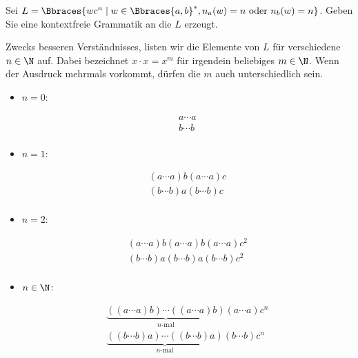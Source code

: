 
\begin{exercise}

Sei $L = \Bbraces{w c^n \mid w \in \Bbraces{a, b}^\ast, n_a(w) = n ~\text{oder}~ n_b(w) = n}$.
Geben Sie eine kontextfreie Grammatik an die $L$ erzeugt.

\end{exercise}


\begin{solution}

Zwecks besseren Verständnisses, listen wir die Elemente von $L$ für verschiedene $n \in \N$ auf.
Dabei bezeichnet $x \cdot x = x^m$ für irgendein beliebiges $m \in \N$.
Wenn der Ausdruck mehrmals vorkommt, dürfen die $m$ auch unterschiedlich sein.

\begin{itemize}

    \item $n = 0$:
    
    \begin{align*}
        a \cdots a \\
        b \cdots b \\
    \end{align*}

    \item $n = 1$:
    
    \begin{align*}
        (a \cdots a) b (a \cdots a) c \\
        (b \cdots b) a (b \cdots b) c \\
    \end{align*}

    \item $n = 2$:
    
    \begin{align*}
        (a \cdots a) b (a \cdots a) b (a \cdots a) c^2 \\
        (b \cdots b) a (b \cdots b) a (b \cdots b) c^2 \\
    \end{align*}

    \item $n \in \N$:
    
    \begin{align*}
        \underbrace
        {
            ((a \cdots a) b)
            \cdots
            ((a \cdots a) b)
        }_{
            \text{$n$-mal}
        }
        (a \cdots a)
        c^n \\
        \underbrace
        {
            ((b \cdots b) a)
            \cdots
            ((b \cdots b) a)
        }_{
            \text{$n$-mal}
        }
        (b \cdots b)
        c^n \\
    \end{align*}
\end{itemize}


\end{solution}
